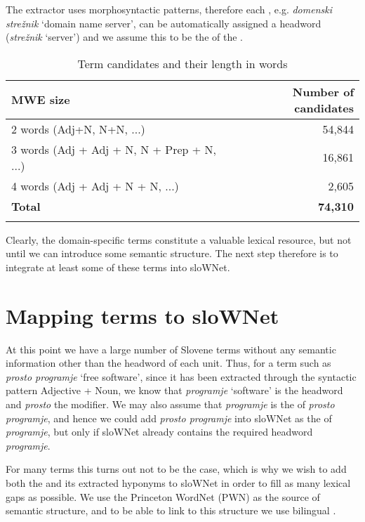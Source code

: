 \documentclass[output=paper]{LSP/langsci}
\begin{document}
The extractor uses morphosyntactic patterns, therefore each  , e.g. \textit{domenski strežnik} `domain name server', can be automatically assigned a headword (\textit{strežnik} `server') and we assume this to be the  of the . 

\begin{table}
\begin{tabular}{lr}
\lsptoprule
{\bfseries MWE size } & \bfseries Number of candidates \\
\midrule
2 words (Adj+N, N+N, ...) & 54,844 \\
3 words (Adj + Adj + N, N + Prep + N, ...) &  16,861 \\
4 words (Adj + Adj + N + N, ...) & 2,605 \\
\bfseries Total & \bfseries 74,310 \\
\lspbottomrule
\end{tabular}
\caption{Term candidates and their length in words}
\label{tab:vintar:3}
\end{table}

Clearly, the domain-specific terms constitute a valuable lexical resource, but not until we can introduce some semantic structure. The next step therefore is to integrate at least some of these terms into sloWNet.

\section{Mapping terms to sloWNet}\label{sec:vintar:4}

At this point we have a large number of Slovene  terms without any semantic information other than the headword of each unit. Thus, for a term such as \textit{prosto programje} `free software', since it has been extracted through the syntactic pattern Adjective + Noun, we know that \textit{programje} `software' is the headword and \textit{prosto} the modifier. We may also assume that \textit{programje} is the  of \textit{prosto programje}, and hence we could add \textit{prosto programje} into sloWNet as the  of \textit{programje}, but only if sloWNet already contains the required headword \textit{programje}. 

For many  terms this turns out not to be the case, which is why we wish to add both the  and its extracted hyponyms to sloWNet in order to fill as many lexical gaps as possible. We use the Princeton WordNet (PWN) as the source of semantic structure, and to be able to link  to this structure we use bilingual . 
\end{document}
